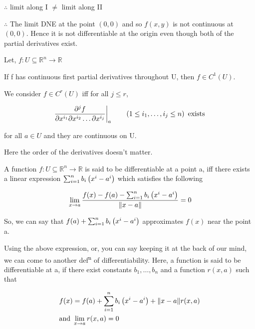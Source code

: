$ \therefore$ limit along I $ \neq$ limit along II

$ \therefore$ The limit DNE at the point $ (0,0)$ and so $ f(x,y)$ is not continuous at $ (0,0)$. Hence it is not differentiable at the origin even though both of the partial derivatives exist.

Let, $ f: U \subseteq \mathbb{R}^n \longrightarrow \mathbb{R}$

If f has continuous first partial derivatives throughout U, then $ f \in C^1(U)$.

\begin{definition}
    We consider $ f \in C^r(U)$ iff for all $ j \leq r$,

    \begin{align*}
        & \frac{\partial^j f}{\partial x^{i_1} \partial x^{i_2} \ldots \partial x^{i_j}} \bigg|_a \qquad \left(  1 \leq i_1, \ldots, i_j \leq n \right) \text{ exists} \\
    \end{align*}

    for all $ a \in U$ and they are continuous on U.
\end{definition}

Here the order of the derivatives doesn't matter.

A function $ f: U \subseteq \mathbb{R}^n \longrightarrow \mathbb{R}$ is said to be differentiable at a point a, iff there exists a linear expression $ \sum_{i=1}^{n} b_i \left(  x^i - a^i \right)$ which satisfies the following

\begin{align*}
    & \displaystyle\lim_{x \to a} \frac{ f(x) - f(a) - \sum_{i=1}^{n} b_i \left(  x^i - a^i \right)}{\| x-a \|} = 0 \\
\end{align*}

So, we can say that $ f(a) + \sum_{i=1}^{n} b_i \left(  x^i - a^i \right)$ approximates $ f(x)$ near the point a.

Using the above expression, or, you can say keeping it at the back of our mind, we can come to another def\textsuperscript{n} of differentiability. Here, a function is said to be differentiable at a, if there exist constants $ b_1, \ldots, b_n$ and a function $ r(x,a)$ such that

\begin{align*}
    & f(x) = f(a) + \sum_{i=1}^{n} b_i \left(  x^i - a^i \right) + \| x-a \| r(x,a) \\
    & \text{and } \displaystyle\lim_{x \to a} r(x,a) = 0 \\
\end{align*}

